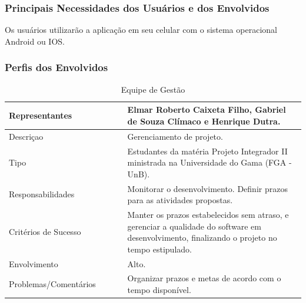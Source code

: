 \subsubsection{Principais Necessidades dos Usuários e dos Envolvidos}

Os usuários utilizarão a aplicação em seu celular com o sistema operacional Android ou IOS.

\subsubsection{Perfis dos Envolvidos}


\begin{table}[htp]
    \centering
    \caption{Equipe de Gestão}
    \label{my-label}
    \begin{tabular}{|p{0.40\linewidth}|p{0.60\linewidth}|}
        \hline
        Representantes    & Elmar Roberto Caixeta Filho, Gabriel de Souza Clímaco e Henrique Dutra. \\ \hline
        Descriçao    & Gerenciamento de projeto. \\ \hline
        Tipo    & Estudantes da matéria Projeto Integrador II ministrada na Universidade do Gama (FGA - UnB). \\ \hline
        Responsabilidades    & Monitorar o desenvolvimento. Definir prazos para as atividades propostas. \\ \hline
        Critérios de Sucesso    & Manter os prazos estabelecidos sem atraso, e gerenciar a qualidade do software em desenvolvimento, finalizando o projeto no tempo estipulado. \\ \hline
        Envolvimento    & Alto. \\ \hline
        Problemas/Comentários    & Organizar prazos e metas de acordo com o tempo disponível. \\ \hline
    \end{tabular}
\end{table}


